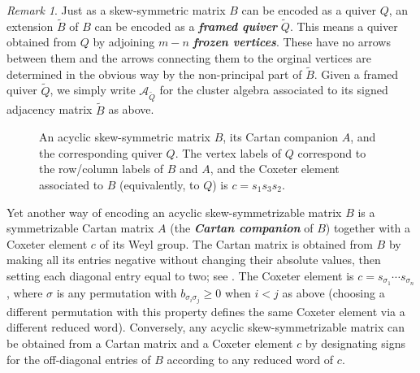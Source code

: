 \documentclass[12pt]{amsart}
\newcommand{\newword}[1]{\textbf{\emph{#1}}}
\newcommand{\cA}{\mathcal{A}}
\theoremstyle{remark}
\newtheorem{remark}[theorem]{Remark}
\numberwithin{equation}{section}
\numberwithin{figure}{section}
\begin{document}
\begin{remark}
Just as a skew-symmetric matrix $B$ can be encoded as a quiver $Q$, an extension $\widetilde{B}$ of $B$ can be encoded as a \newword{framed quiver} $\widetilde{Q}$.
This means a quiver obtained from $Q$ by adjoining $m -  n$ \newword{frozen vertices}.
These have no arrows between them and the arrows connecting them to the orginal vertices are determined in the obvious way by the non-principal part of $\widetilde{B}$.
Given a framed quiver $\widetilde{Q}$, we simply write $\cA_{\widetilde{Q}}$ for the cluster algebra associated to its signed adjacency matrix $\widetilde{B}$ as above.
\end{remark}

\begin{figure}%
  \centering
  \caption{
    An acyclic skew-symmetric matrix $B$, its Cartan companion $A$, and the corresponding quiver $Q$.
    The vertex labels of $Q$ correspond to the row/column labels of $B$ and $A$, and the Coxeter element associated to $B$ (equivalently, to $Q$) is $c = s_1 s_3 s_2$.
  }
  \label{fig:matrices}
\end{figure}  

Yet another way of encoding an acyclic skew-symmetrizable matrix $B$ is a symmetrizable Cartan matrix $A$ (the \newword{Cartan companion} of $B$) together with a Coxeter element $c$ of its Weyl group. 
The Cartan matrix is obtained from $B$ by making all its entries negative without changing their absolute values, then setting each diagonal entry equal to two; see . 
The Coxeter element is $c = s_{\sigma_1}\cdots s_{\sigma_n}$, where $\sigma$ is any permutation with $b_{\sigma_i \sigma_j} \geq 0$ when $i < j$ as above (choosing a different permutation with this property defines the same Coxeter element via a different reduced word).
Conversely, any acyclic skew-symmetrizable matrix can be obtained from a Cartan matrix and a Coxeter element $c$ by designating signs for the off-diagonal entries of $B$ according to any reduced word of $c$.
\end{document}
